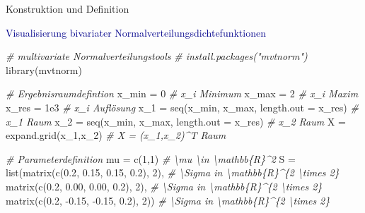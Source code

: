 \documentclass[
  8pt,
  ignorenonframetext,
]{beamer}
\newenvironment{Shaded}{\begin{snugshade}}{\end{snugshade}}
\newcommand{\AttributeTok}[1]{\textcolor[rgb]{0.77,0.63,0.00}{#1}}
\newcommand{\CommentTok}[1]{\textcolor[rgb]{0.56,0.35,0.01}{\textit{#1}}}
\newcommand{\DecValTok}[1]{\textcolor[rgb]{0.00,0.00,0.81}{#1}}
\newcommand{\FloatTok}[1]{\textcolor[rgb]{0.00,0.00,0.81}{#1}}
\newcommand{\FunctionTok}[1]{\textcolor[rgb]{0.00,0.00,0.00}{#1}}
\newcommand{\NormalTok}[1]{#1}
\newcommand{\OtherTok}[1]{\textcolor[rgb]{0.56,0.35,0.01}{#1}}
\newcommand{\SpecialCharTok}[1]{\textcolor[rgb]{0.00,0.00,0.00}{#1}}
\begin{document}
\begin{frame}[fragile]{Konstruktion und Definition}
\protect\hypertarget{konstruktion-und-definition-6}{}
\vspace{1mm}

\textcolor{darkblue}{Visualisierung bivariater Normalverteilungsdichtefunktionen}
\vspace{1mm} \tiny {}

\begin{Shaded}
\begin{Highlighting}[]
\CommentTok{\# multivariate Normalverteilungstools}
\CommentTok{\# install.packages("mvtnorm")}
\FunctionTok{library}\NormalTok{(mvtnorm)}


\CommentTok{\# Ergebnisraumdefintion}
\NormalTok{x\_min  }\OtherTok{=} \DecValTok{0}                                           \CommentTok{\# x\_i Minimum}
\NormalTok{x\_max  }\OtherTok{=} \DecValTok{2}                                           \CommentTok{\# x\_i Maxim}
\NormalTok{x\_res  }\OtherTok{=} \FloatTok{1e3}                                         \CommentTok{\# x\_i Auflösung}
\NormalTok{x\_1    }\OtherTok{=} \FunctionTok{seq}\NormalTok{(x\_min, x\_max, }\AttributeTok{length.out =}\NormalTok{ x\_res)       }\CommentTok{\# x\_1 Raum}
\NormalTok{x\_2    }\OtherTok{=} \FunctionTok{seq}\NormalTok{(x\_min, x\_max, }\AttributeTok{length.out =}\NormalTok{ x\_res)       }\CommentTok{\# x\_2 Raum}
\NormalTok{X      }\OtherTok{=} \FunctionTok{expand.grid}\NormalTok{(x\_1,x\_2)                        }\CommentTok{\# X = (x\_1,x\_2)\^{}T Raum}

\CommentTok{\# Parameterdefinition}
\NormalTok{mu     }\OtherTok{=} \FunctionTok{c}\NormalTok{(}\DecValTok{1}\NormalTok{,}\DecValTok{1}\NormalTok{)                                      }\CommentTok{\# \textbackslash{}mu \textbackslash{}in \textbackslash{}mathbb\{R\}\^{}2}
\NormalTok{S      }\OtherTok{=} \FunctionTok{list}\NormalTok{(}\FunctionTok{matrix}\NormalTok{(}\FunctionTok{c}\NormalTok{(}\FloatTok{0.2}\NormalTok{,  }\FloatTok{0.15}\NormalTok{,  }\FloatTok{0.15}\NormalTok{, }\FloatTok{0.2}\NormalTok{), }\DecValTok{2}\NormalTok{),  }\CommentTok{\# \textbackslash{}Sigma in \textbackslash{}mathbb\{R\}\^{}\{2 \textbackslash{}times 2\}}
              \FunctionTok{matrix}\NormalTok{(}\FunctionTok{c}\NormalTok{(}\FloatTok{0.2}\NormalTok{,  }\FloatTok{0.00}\NormalTok{,  }\FloatTok{0.00}\NormalTok{, }\FloatTok{0.2}\NormalTok{), }\DecValTok{2}\NormalTok{),  }\CommentTok{\# \textbackslash{}Sigma in \textbackslash{}mathbb\{R\}\^{}\{2 \textbackslash{}times 2\}}
              \FunctionTok{matrix}\NormalTok{(}\FunctionTok{c}\NormalTok{(}\FloatTok{0.2}\NormalTok{, }\SpecialCharTok{{-}}\FloatTok{0.15}\NormalTok{, }\SpecialCharTok{{-}}\FloatTok{0.15}\NormalTok{, }\FloatTok{0.2}\NormalTok{), }\DecValTok{2}\NormalTok{))  }\CommentTok{\# \textbackslash{}Sigma in \textbackslash{}mathbb\{R\}\^{}\{2 \textbackslash{}times 2\}}


\end{Highlighting}
\end{Shaded}
\end{frame}
\end{document}
